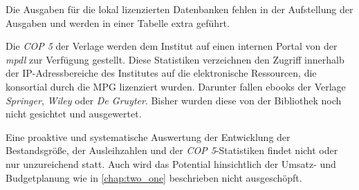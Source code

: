 Die Ausgaben für die lokal lizenzierten Datenbanken fehlen in der Aufstellung der Ausgaben und werden in einer Tabelle extra geführt.

Die \textit{\acrfull{COP 5}} der Verlage werden dem Institut auf einen internen Portal von der \textit{\acrshort{mpdl}} zur Verfügung gestellt.
Diese Statistiken verzeichnen den Zugriff innerhalb der IP-Adressbereiche des Institutes auf die elektronische Ressourcen, 
die konsortial durch die \acrshort{MPG} lizenziert wurden. Darunter fallen ebooks der Verlage 
\textit{Springer}, \textit{Wiley} oder \textit{De Gruyter}. Bisher wurden diese von der Bibliothek noch nicht gesichtet und ausgewertet.

Eine proaktive und systematische Auswertung der Entwicklung der Bestandsgröße, der Ausleihzahlen und der \textit{\acrshort{COP 5}}-Statistiken findet nicht
oder nur unzureichend statt. Auch wird das Potential hinsichtlich der Umsatz- und Budgetplanung wie in \autoref{chap:two_one} beschrieben
nicht ausgeschöpft.



